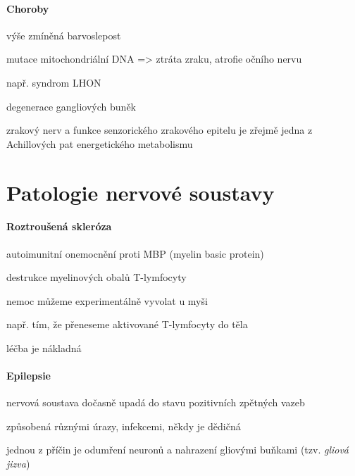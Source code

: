 \documentclass[DIV=8]{scrreprt}
\begin{document}
\paragraph{Choroby}
\begin{myItemize}[nosep]
    \item výše zmíněná barvoslepost
    \item mutace mitochondriální DNA => ztráta zraku, atrofie očního nervu
\begin{myItemize}[nosep]
    \item např. syndrom LHON
\begin{myItemize}[nosep]
    \item degenerace gangliových buněk
\end{myItemize}

    \item zrakový nerv a funkce senzorického zrakového epitelu je zřejmě jedna z Achillových pat energetického metabolismu
\end{myItemize}

\end{myItemize}



\section{Patologie nervové soustavy} \label{Patologie nervové soustavy} \FloatBarrier


\paragraph{Roztroušená skleróza}
\begin{myItemize}[nosep]
    \item autoimunitní onemocnění proti MBP (myelin basic protein)
    \item destrukce myelinových obalů T-lymfocyty
    \item nemoc můžeme experimentálně vyvolat u myši
\begin{myItemize}[nosep]
    \item např. tím, že přeneseme aktivované T-lymfocyty do těla
\end{myItemize}

    \item léčba je nákladná
\end{myItemize}



\paragraph{Epilepsie}
\begin{myItemize}[nosep]
    \item nervová soustava dočasně upadá do stavu pozitivních zpětných vazeb
    \item způsobená různými úrazy, infekcemi, někdy je dědičná
    \item jednou z příčin je odumření neuronů a nahrazení gliovými buňkami (tzv. \emph{gliová jizva})
\end{myItemize}
\end{document}
